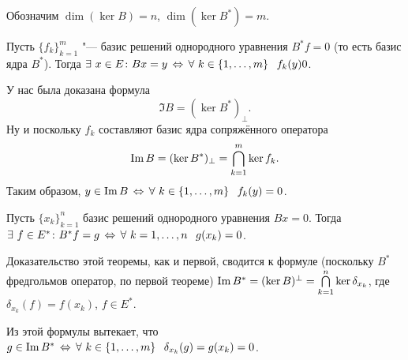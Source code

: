 Обозначим $\dim(\ker B) = n$, $\dim (\ker B^*) = m$.

\begin{The}
  Пусть $\{f_k\}_{k=1}^m$ "--- базис решений однородного уравнения $B^*f=0$ (то есть базис ядра $B^*$). Тогда $\exists\ x\in E\colon Bx=y\iff \forall\ k\in\{1,\dots,m\}\pau f_k(y)0$.
\end{The}
\begin{Proof}
  У нас была доказана формула 
\[\Im B = (\ker B^*)_\perp.\]
Ну и поскольку $f_k$ составляют базис ядра сопряжённого оператора
\[\mathop{\mathrm{Im}} B = (\ker B^*)_\perp= \bigcap\limits_{k=1}^{m} \ker f_k.\]
Таким образом, $y\in \Im B\iff \forall\ k\in\{1,\dots, m\}\pau f_k(y) = 0$.
\end{Proof}

\begin{The}
  Пусть $\{x_k\}_{k=1}^n$ базис решений однородного уравнения $Bx=0$. Тогда $\exists\ f\in E^*\colon B^*f = g\,\Leftrightarrow\, \forall\ k=1,\dots,n\hskip .75em plus.1em minus.08em\relax g(x_k)=0$.
\end{The}
\begin{Proof}
Доказательство этой теоремы, как и первой, сводится к формуле (поскольку $B^*$ фредгольмов оператор, по первой теореме) $\mathop{\mathrm{Im}} B^* = (\ker B)^\perp = \bigcap\limits_{k=1}^{n}\ker \delta_{x_k}$, где 
$\delta_{x_k}(f) = f(x_k)$, $f\in E^*$.

Из этой формулы вытекает, что $g\in \mathop{\mathrm{Im}} B^*\,\Leftrightarrow\,\forall\ k\in\{1,\dots,m\}\hskip .75em plus.1em minus.08em\relax  \delta_{x_k}(g) = g(x_k) = 0$.
\end{Proof}

